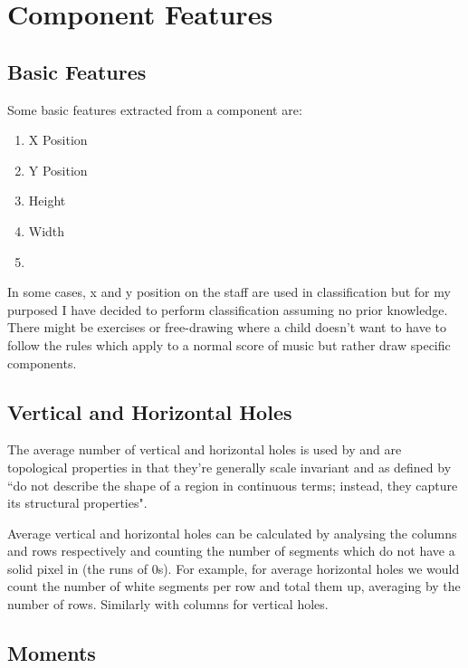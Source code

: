 \section{Component Features}

\subsection{Basic Features}

Some basic features extracted from a component are:

\begin{enumerate}
  \item X Position
  \item Y Position
  \item Height
  \item Width
  \item 
\end{enumerate}

In some cases, x and y position on the staff are used in classification but for my purposed I have decided to perform classification assuming no prior knowledge. There might be exercises or free-drawing where a child doesn't want to have to follow the rules which apply to a normal score of music but rather draw specific components.

\subsection{Vertical and Horizontal Holes}

The average number of vertical and horizontal holes is used by \cite{fujinaga1996adaptive} and are topological properties in that they're generally scale invariant and as defined by \cite{burger2009principles} ``do not describe the shape of a region in continuous terms; instead, they capture its structural properties".

Average vertical and horizontal holes can be calculated by analysing the columns and rows respectively and counting the number of segments which do not have a solid pixel in (the runs of 0s). For example, for average horizontal holes we would count the number of white segments per row and total them up, averaging by the number of rows. Similarly with columns for vertical holes.

\subsection{Moments}

